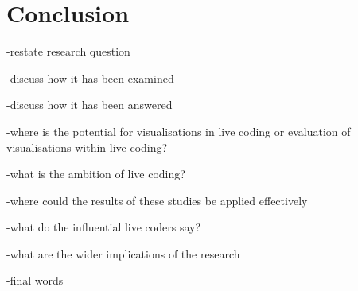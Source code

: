 
\chapter{Conclusion}
\label{chap:conclusion}

-restate research question

-discuss how it has been examined


-discuss how it has been answered

-where is the potential for visualisations in live coding or evaluation of visualisations within live coding?

-what is the ambition of live coding?

-where could the results of these studies be applied effectively

-what do the influential live coders say?

-what are the wider implications of the research

-final words

